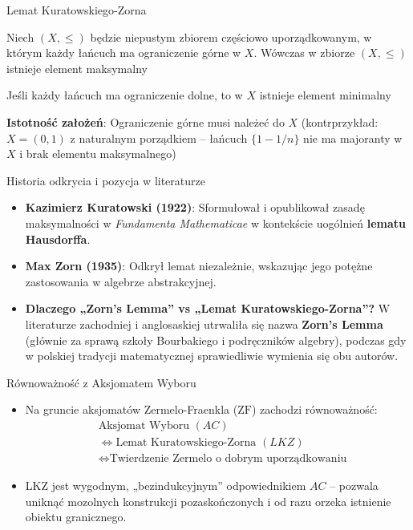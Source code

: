 \documentclass[aspectratio=169,11pt,t,envcountsect,professionalfonts]{beamer}
\begin{document}
\begin{frame}{Lemat Kuratowskiego-Zorna}

\begin{mythm}
Niech $(X, \leqslant)$ będzie niepustym zbiorem częściowo uporządkowanym, w którym każdy łańcuch ma ograniczenie górne w $X$. Wówczas w zbiorze $(X, \leqslant)$ istnieje element maksymalny
\end{mythm}
\begin{mythm}
Jeśli każdy łańcuch ma ograniczenie dolne, to w $X$ istnieje element minimalny
\end{mythm}

\textbf{Istotność założeń}: Ograniczenie górne musi należeć do $X$ (kontrprzykład: $X = (0, 1)$ z naturalnym porządkiem – łańcuch $\{1 - 1/n\}$ nie ma majoranty w $X$ i brak elementu maksymalnego)

\end{frame}

\begin{frame}{Historia odkrycia i pozycja w literaturze}
\begin{itemize}
    
\item \textbf{Kazimierz Kuratowski (1922)}: Sformułował i opublikował zasadę maksymalności w \textit{Fundamenta Mathematicae} w kontekście uogólnień \textbf{lematu Hausdorffa}.

\item \textbf{Max Zorn (1935)}: Odkrył lemat niezależnie, wskazując jego potężne zastosowania w algebrze abstrakcyjnej.

\item \textbf{Dlaczego „Zorn's Lemma” vs „Lemat Kuratowskiego-Zorna”?} W literaturze zachodniej i anglosaskiej utrwaliła się nazwa \textbf{Zorn's Lemma} (głównie za sprawą szkoły Bourbakiego i podręczników algebry), podczas gdy w polskiej tradycji matematycznej sprawiedliwie wymienia się obu autorów.
\end{itemize}
\end{frame}

\begin{frame}{Równoważność z Aksjomatem Wyboru}
\begin{itemize}
    \item 
    Na gruncie aksjomatów Zermelo-Fraenkla ($\text{ZF}$) zachodzi równoważność:
    \begin{align*}
        & \text{Aksjomat Wyboru } (AC) \\
        &\iff \text{Lemat Kuratowskiego-Zorna } (LKZ) \\
        &\iff \text{Twierdzenie Zermelo o dobrym uporządkowaniu}
    \end{align*}
    \item LKZ jest wygodnym, „bezindukcyjnym” odpowiednikiem $AC$ – pozwala uniknąć mozolnych konstrukcji pozaskończonych i od razu orzeka istnienie obiektu granicznego.
\end{itemize}
    
\end{frame}
\end{document}
